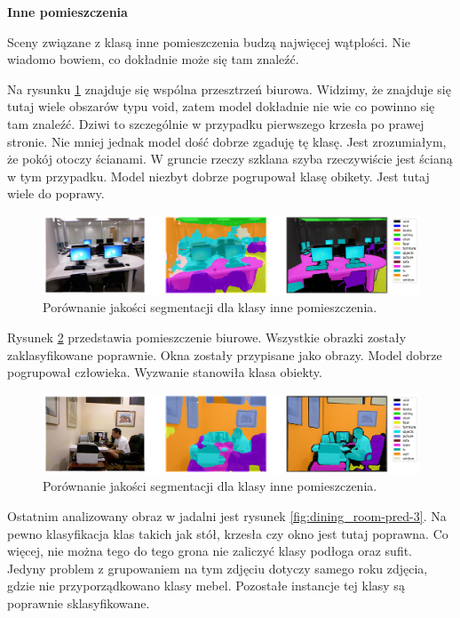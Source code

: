 \noindent
\textbf{Inne pomieszczenia}

Sceny związane z klasą inne pomieszczenia budzą najwięcej wątplości. Nie wiadomo bowiem, co dokładnie może się tam znaleźć.

Na rysunku \ref{fig:other_indoor-pred-1} znajduje się wspólna przesztrzeń biurowa. Widzimy, że znajduje się tutaj wiele obszarów typu void, zatem model dokładnie nie wie co powinno się tam znaleźć. Dziwi to szczególnie w przypadku pierwszego krzesła po prawej stronie. Nie mniej jednak model dość dobrze zgaduję tę klasę. Jest zrozumiałym, że pokój otoczy ścianami. W gruncie rzeczy szklana szyba rzeczywiście jest ścianą w tym przypadku. Model niezbyt dobrze pogrupował klasę obikety. Jest tutaj wiele do poprawy.

\begin{figure}[ht!]
    \centering
    \includegraphics[width=\textwidth]{img/preds_analysis/gt_vs_pred/other_indoor-1.png}
    \caption{Porównanie jakości segmentacji dla klasy inne pomieszczenia.}
    \label{fig:other_indoor-pred-1}
\end{figure}

Rysunek \ref{fig:other_indoor-pred-2} przedstawia pomieszczenie biurowe. Wszystkie obrazki zostały zaklasyfikowane poprawnie. Okna zostały przypisane jako obrazy. Model dobrze pogrupował człowieka. Wyzwanie stanowiła klasa obiekty.

\begin{figure}[ht!]
    \centering
    \includegraphics[width=\textwidth]{img/preds_analysis/gt_vs_pred/other_indoor-2.png}
    \caption{Porównanie jakości segmentacji dla klasy inne pomieszczenia.}
    \label{fig:other_indoor-pred-2}
\end{figure}


Ostatnim analizowany obraz w jadalni jest rysunek \ref{fig:dining_room-pred-3}. Na pewno klasyfikacja klas takich jak stół, krzesła czy okno jest tutaj poprawna. Co więcej, nie można tego do tego grona nie zaliczyć klasy podłoga oraz sufit. Jedyny problem z grupowaniem na tym zdjęciu dotyczy samego roku zdjęcia, gdzie nie przyporządkowano klasy mebel. Pozostałe instancje tej klasy są poprawnie sklasyfikowane.

